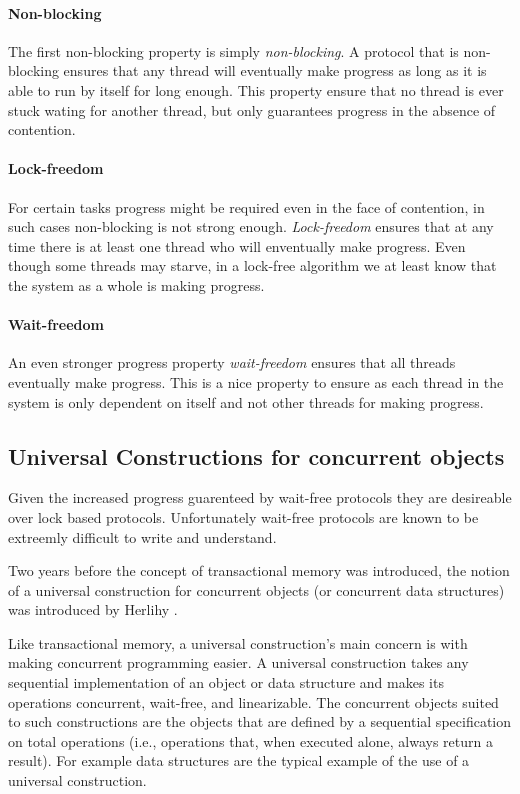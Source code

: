 \paragraph{Non-blocking}
The first non-blocking property is simply \emph{non-blocking}.
A protocol that is non-blocking ensures that any thread will eventually make progress
as long as it is able to run by itself for long enough.
This property ensure that no thread is ever stuck wating for another thread, but only guarantees
progress in the absence of contention.

\paragraph{Lock-freedom}
For certain tasks progress might be required even in the face of contention, in such cases
non-blocking is not strong enough.
\emph{Lock-freedom} ensures that at any time there is at least one thread who will enventually make progress.
Even though some threads may starve, in a lock-free algorithm we at least know that the
system as a whole is making progress.

\paragraph{Wait-freedom}
An even stronger progress property \emph{wait-freedom} ensures that
all threads eventually make progress.
This is a nice property to ensure as each thread in the system
is only dependent on itself and not other threads for making progress.










\subsection{Universal Constructions for concurrent objects}



Given the increased progress guarenteed by wait-free protocols
they are desireable over lock based protocols.
Unfortunately wait-free protocols are
known to be extreemly difficult to write and understand.

Two years before the concept of transactional memory 
was introduced, the notion of a universal construction for concurrent objects (or 
concurrent data  structures) was introduced by Herlihy \cite{H91}.

Like transactional memory, a universal construction's main concern is
with making concurrent programming easier.
A universal construction takes any sequential implementation
of an object or data structure and makes its operations concurrent, wait-free,
and linearizable.
The concurrent objects suited to such   constructions are 
the objects that are  defined by a sequential specification
on total operations (i.e., operations that, when executed alone, 
always return a result).
For example data structures are the typical example
of the use of a universal construction.


